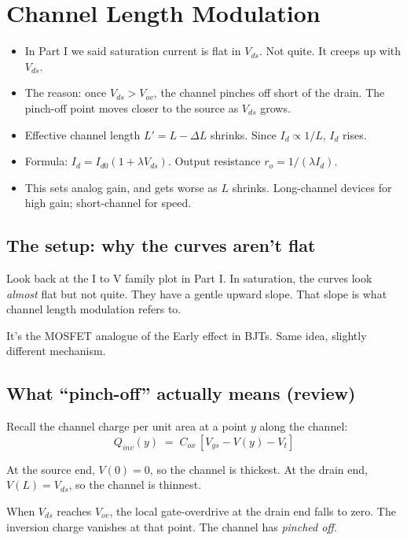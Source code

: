 \documentclass[11pt]{article}
\begin{document}
\section{Channel Length Modulation}

\begin{tldr}
\begin{itemize}[leftmargin=*]
\item In Part I we said saturation current is flat in $V_{ds}$. Not quite. It creeps up with $V_{ds}$.
\item The reason: once $V_{ds} > V_{ov}$, the channel pinches off short of the drain. The pinch-off point moves closer to the source as $V_{ds}$ grows.
\item Effective channel length $L' = L - \Delta L$ shrinks. Since $I_d \propto 1/L$, $I_d$ rises.
\item Formula: $I_d = I_{d0}(1 + \lambda V_{ds})$. Output resistance $r_o = 1/(\lambda I_d)$.
\item This sets analog gain, and gets worse as $L$ shrinks. Long-channel devices for high gain; short-channel for speed.
\end{itemize}
\end{tldr}

\subsection{The setup: why the curves aren't flat}

Look back at the I to V family plot in Part I. In saturation, the curves look \emph{almost} flat but not quite. They have a gentle upward slope. That slope is what channel length modulation refers to.

It's the MOSFET analogue of the Early effect in BJTs. Same idea, slightly different mechanism.

\subsection{What ``pinch-off'' actually means (review)}

Recall the channel charge per unit area at a point $y$ along the channel:
\[
Q_{inv}(y) \;=\; C_{ox}\,[V_{gs} - V(y) - V_t]
\]

At the source end, $V(0) = 0$, so the channel is thickest. At the drain end, $V(L) = V_{ds}$, so the channel is thinnest.

When $V_{ds}$ reaches $V_{ov}$, the local gate-overdrive at the drain end falls to zero. The inversion charge vanishes at that point. The channel has \emph{pinched off}.
\end{document}
